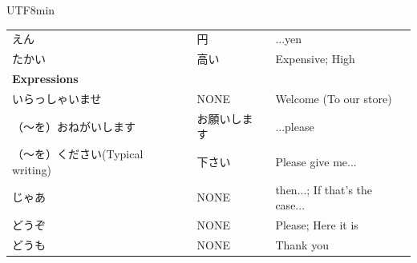 \documentclass[11pt]{article}
\begin{document}
\begin{CJK}{UTF8}{min}
\begin{tabularx}{\textwidth}{X | X | X}
    えん & 円 & ...yen \\
    たかい & 高い & Expensive; High \\
    \hline
    \textbf{Expressions} &  & \\
    いらっしゃいませ & NONE & Welcome (To our store) \\
    （〜を）おねがいします & お願いします & ...please \\
    （〜を）ください(Typical writing) & 下さい & Please give me... \\
    じゃあ & NONE & then...; If that's the case... \\
    どうぞ & NONE & Please; Here it is \\
    どうも & NONE & Thank you \\
    \bottomrule
\end{tabularx}

\newpage

\end{CJK}
\end{document}
